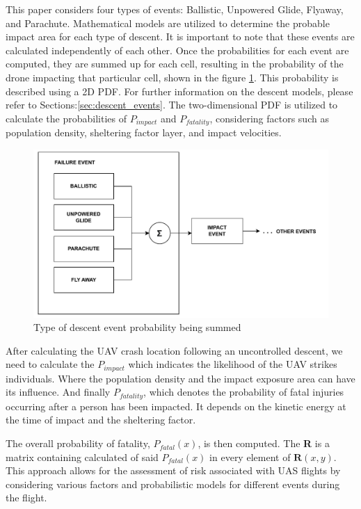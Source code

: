 \documentclass[12pt]{report}
\begin{document}
        This paper considers four types of events: Ballistic, Unpowered Glide, Flyaway, and Parachute. Mathematical
        models are utilized to determine the probable impact area for each type of descent. It is important to note that
        these events are calculated independently of each other. Once the probabilities for each event are computed,
        they are summed up for each cell, resulting in the probability of the drone impacting that particular cell,
        shown in the figure \ref{fig:summer}. This probability is described using a 2D \ac{PDF}. For further information
        on the descent models, please refer to Sections:\ref{sec:descent_events}. The two-dimensional PDF is utilized to
        calculate the probabilities of \(P_{impact}\) and \(P_{fatality}\), considering factors such as population
        density, sheltering factor layer, and impact velocities.

        \begin{figure}[H]
            \label{fig:summer}
            \centering
            \includegraphics[width=\textwidth]{General Image/OSM Drone-LOGIC_SUM.pdf}
            \caption{Type of descent event probability being summed}
        \end{figure}

        After calculating the UAV crash location following an uncontrolled descent, we need to calculate the
        \(P_{impact}\) which indicates the likelihood of the UAV strikes individuals. Where the population density and
        the impact exposure area can have its influence. And finally \(P_{fatality}\), which denotes the probability of
        fatal injuries occurring after a person has been impacted. It depends on the kinetic energy at the time of
        impact and the sheltering factor.

        The overall probability of fatality, \(P_{fatal}(x)\), is then computed. The \textbf{R} is a matrix
        containing calculated of said \(P_{fatal}(x)\) in every element of \(\mathbf{R}(x, y)\). This approach allows
        for the assessment of risk associated with UAS flights by considering various factors and probabilistic models
        for different events during the flight.
\end{document}
